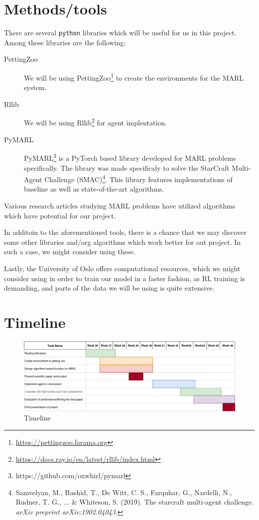 \documentclass{article}
\begin{document}
\section{Methods/tools}
There are several \texttt{python} libraries which will be useful for us in this project.
Among these libraries are the following:
\begin{description}
  \item[PettingZoo] We will be using PettingZoo\footnote[1]{\url{https://pettingzoo.farama.org}}
    to create the environments for the MARL system.
  \item[Rllib] We will be using Rllib\footnote[2]{\url{https://docs.ray.io/en/latest/rllib/index.html}}
    for agent implentation.
  \item[PyMARL] PyMARL\footnote[3]{https://github.com/oxwhirl/pymarl} is a PyTorch based library
    developed for MARL problems specifically. The library was made specificaly to solve the StarCraft
    Multi-Agent Challenge (SMAC)\footnote[4]{Samvelyan, M., Rashid, T., De Witt, C. S., Farquhar, G., Nardelli, N., Rudner, T. G., ... \& Whiteson, S. (2019). The starcraft multi-agent challenge. \textit{arXiv preprint arXiv:1902.04043}.}. %
    This library features implementations of baseline as well as state-of-the-art algorithms.
\end{description}

\noindent
Various research articles studying MARL problems have utilized algorithms which have potential for our
project.

\noindent
In additoin to the aforementioned tools, there is a chance that we may discover some other libraries and/org
algorithms which work better for out project. In such a case, we might consider using these.

\noindent
Lastly, the University of Oslo offers computational resources, which we might consider using in order to
train our model in a faster fashion, as RL training is demanding, and parts of the data we will be using is quite extensive.

\section{Timeline}
\begin{figure}[h]
    \begin{center}
        \includegraphics[width=\textwidth]{Timeline.png}
    \end{center}
    \caption{Timeline}
    \label{fig:timeline}
\end{figure}
\end{document}

